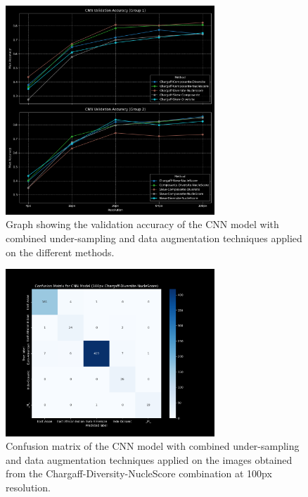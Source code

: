 \begin{appendices}
	\begin{figure}[htbp!]
		\centering
		\includegraphics[width=0.7\textwidth]{../imgs/graphs/kfold-undersample/cnn_validation_accuracy_groups_mask_5_kfold_aug-under.png}
		\caption{Graph showing the validation accuracy of the CNN model with combined under-sampling and data augmentation
			techniques applied on the different methods.}
		\label{fig:combined_techniques_accuracy}
	\end{figure}

	\begin{figure}[htbp!]
		\centering
		\includegraphics[width=0.7\textwidth]{../imgs/graphs/kfold-undersample/cnn_confusion_matrix_100px_mask_5-kfold_aug-under.png}
		\caption{Confusion matrix of the CNN model with combined under-sampling and data augmentation techniques
			applied on the images obtained from the Chargaff-Diversity-NucleScore combination at 100px resolution.}
		\label{fig:combined_techniques_confusion_matrix}
	\end{figure}


\end{appendices}
